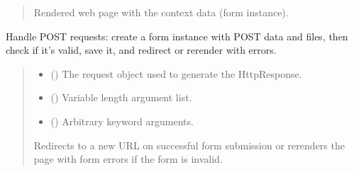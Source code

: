 \documentclass[letterpaper,10pt,english]{sphinxmanual}
\begin{document}
\begin{fulllineitems}
\begin{fulllineitems}
\begin{quote}
\begin{description}
\begin{itemize}
\end{itemize}

\sphinxAtStartPar
{} \textendash{} Rendered web page with the context data (form instance).

\end{description}\end{quote}

\end{fulllineitems}


\begin{fulllineitems}
\label{\detokenize{source/meta_models_management:meta_models_management.views.HomeView.post}}
\pysigstartsignatures
{}
\pysigstopsignatures
\sphinxAtStartPar
Handle POST requests: create a form instance with POST data and files,
then check if it’s valid, save it, and redirect or re\sphinxhyphen{}render with errors.
\begin{quote}\begin{description}
\begin{itemize}
\item {} 
\sphinxAtStartPar
{} () \textendash{} The request object used to generate the HttpResponse.

\item {} 
\sphinxAtStartPar
{} () \textendash{} Variable length argument list.

\item {} 
\sphinxAtStartPar
{} () \textendash{} Arbitrary keyword arguments.

\end{itemize}

\sphinxAtStartPar
{} \textendash{} Redirects to a new URL on successful form submission or
re\sphinxhyphen{}renders the page with form errors if the form is invalid.

\end{description}\end{quote}

\end{fulllineitems}


\end{fulllineitems}
\end{document}
